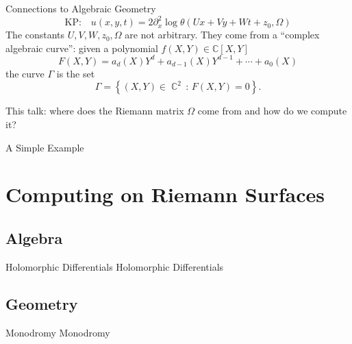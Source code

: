 \documentclass {beamer}
\DeclareMathOperator{\CC}{\mathbb{C}}
\begin{document}
\begin{frame}{Connections to Algebraic Geometry}{}
  \[
    \text{KP:} \quad u(x,y,t) = 2 \partial_x^2 \log
    \theta(Ux + Vy + Wt + z_0, \Omega)
  \]
  The constants $U,V,W,z_0,\Omega$ are not arbitrary. They come from a
  ``complex algebraic curve'': given a polynomial $f(X,Y) \in
  \mathbb{C}[X,Y]$
  \[
  F(X,Y) = a_d(X)Y^d + a_{d-1}(X)Y^{d-1} + \cdots + a_0(X)
  \]
  the curve $\Gamma$ is the set
  \[
  \Gamma = \left\{ (X,Y) \in \CC^2 \, : \, F(X,Y) = 0 \right\}.
  \]

  \begin{block}
  {This talk: where does the Riemann matrix $\Omega$ come from and how
    do we compute it?}
  \end{block}
\end{frame}

\begin{frame}{A Simple Example}{}
\end{frame}



\section{Computing on Riemann Surfaces}

\subsection{Algebra}

\begin{frame}{Holomorphic Differentials}
  Holomorphic Differentials
\end{frame}

\subsection{Geometry}

\begin{frame}{Monodromy}
  Monodromy
\end{frame}
\end{document}
